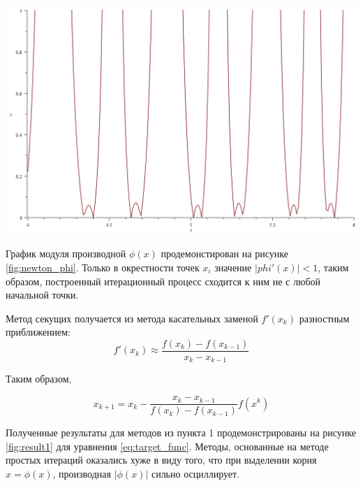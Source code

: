 \documentclass[a4paper, fontsize=14pt]{article}
\begin{document}
\begin{center}
    \includegraphics[scale=0.4]{src/newton_iter.png}
    \label{fig:newton_phi}
\end{center}


График модуля производной $\phi(x)$ продемонстирован на рисунке \ref{fig:newton_phi}. Только в окрестности точек $x_i$ значение $| phi'(x) |< 1$, 
таким образом, построенный итерационный процесс сходится к ним не с любой начальной точки.

Метод секущих получается из метода касательных заменой $f'(x_k)$ разностным приближением: 
\begin{equation*}
    f'(x_k) \approx \frac{f(x_k) - f(x_{k-1})}{x_k - x_{k-1}}
\end{equation*}

Таким образом,

\begin{equation*}
    x_{k+1} = x_k -  \frac{x_k - x_{k-1}}{f(x_k) - f(x_{k-1})} f(x^k)
\end{equation*}

Полученные результаты для методов из пункта 1 продемонстрированы на рисунке \ref{fig:result1} для уравнения \eqref{eq:target_func}.
Методы, основанные на методе простых итераций оказались хуже в виду того, что при выделении корня $x = \phi(x)$, производная $| \phi(x) | $ сильно осциллирует.
\end{document}
